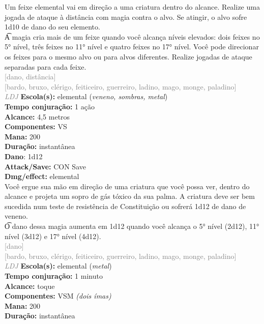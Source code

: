 \documentclass{RPG_Adventure}[2021/10/20]
\begin{document}
{\normalsize Um feixe elemental vai em direção a uma criatura dentro do alcance. Realize uma jogada de ataque à distância com magia contra o alvo. Se atingir, o alvo sofre 1d10 de dano do seu elemento.\\\t A magia cria mais de um feixe quando você alcança níveis elevados: dois feixes no 5° nível, três feixes no 11° nível e quatro feixes no 17° nível. Você pode direcionar os feixes para o mesmo alvo ou para alvos diferentes. Realize jogadas de ataque separadas para cada feixe.\\}
{\scriptsize \textcolor{gray}{[dano, distância]\\}}
{\scriptsize \textcolor{gray}{[bardo, bruxo, clérigo, feiticeiro, guerreiro, ladino, mago, monge, paladino]\\}}
{\tiny \textcolor{gray}{\textit{LDJ}}}
{\small \t \textbf{Escola(s):} elemental (\textit{veneno, sombras, metal})\\\t \textbf{Tempo conjuração:} 1 ação\\\t \textbf{Alcance:} 4,5 metros\\\t \textbf{Componentes:} VS\\\t \textbf{Mana:} 200\\\t \textbf{Duração:} instantânea\\\t \textbf{Dano}: 1d12\\\t \textbf{Attack/Save:} CON Save\\\t \textbf{Dmg/effect:} elemental\\}
{\normalsize Você ergue sua mão em direção de uma criatura que você possa ver, dentro do alcance e projeta um sopro de gás tóxico da sua palma. A criatura deve ser bem sucedida num teste de resistência de Constituição ou sofrerá 1d12 de dano de veneno.\\\t O dano dessa magia aumenta em 1d12 quando você alcança o 5° nível (2d12), 11° nível (3d12) e 17° nível (4d12).\\}
{\scriptsize \textcolor{gray}{[dano]\\}}
{\scriptsize \textcolor{gray}{[bardo, bruxo, clérigo, feiticeiro, guerreiro, ladino, mago, monge, paladino]\\}}
{\tiny \textcolor{gray}{\textit{LDJ}}}
{\small \t \textbf{Escola(s):} elemental (\textit{metal})\\\t \textbf{Tempo conjuração:} 1 minuto\\\t \textbf{Alcance:} toque\\\t \textbf{Componentes:} VSM \textit{(dois ímas)}\\\t \textbf{Mana:} 200\\\t \textbf{Duração:} instantânea\\}
\end{document}

